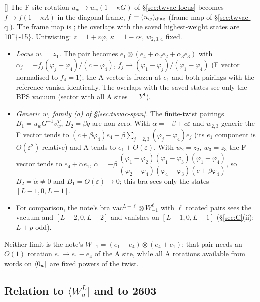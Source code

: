 [] The F-site rotation $u_w\to u_w(1-\kappa G)$ of \S\ref{sec:twvac-locus} becomes $f\to f(1-\kappa\Lambda)$ in the diagonal frame, $f=(u_w)_{\rm diag}$ (frame map of
\S\ref{sec:twvac-q}). The frame map is \ex; the overlaps with the saved highest-weight states are \num{10^{-15}}. Untwisting: $z=1+\varepsilon\varphi$, $\kappa=1-c\varepsilon$, $w_{2,3,4}$ fixed.
\begin{itemize}
\item \emph{Locus $w_1=z_1$.} The pair becomes $e_1\otimes(e_4+\alpha_2e_2+\alpha_3e_3)$ with $\alpha_j=-f_j(\varphi_j-\varphi_4)/(c-\varphi_4)$, $f_j\to(\varphi_1-\varphi_j)/(\varphi_1-\varphi_4)$ (F vector normalised to $f_4=1$); the A vector is frozen at $e_1$
and both pairings with the reference vanish identically. The overlaps with the saved states see only the BPS vacuum (sector with all A sites $=Y^1$).
\item \emph{Generic $w$, family (a) of \S\ref{sec:twvac-span}.} The finite-twist pairings $B_1=u_wG^{-1}v_w^T$, $B_2=\beta q$ are non-zero. With $\alpha=-\beta+c\varepsilon$ and $w_{2,3}$ generic the F vector tends to
$(c+\beta\varphi_4)e_4+\beta\sum_{j=2,3}(\varphi_j-\varphi_4)e_j$ (its $e_1$ component is $O(\varepsilon^2)$ relative) and A tends to $e_1+O(\varepsilon)$. With $w_2=z_2$, $w_3=z_3$ the F vector tends to
$e_4+\tilde\alpha e_1$, $\tilde\alpha=-\beta\,\dfrac{(\varphi_1-\varphi_2)(\varphi_1-\varphi_3)(\varphi_1-\varphi_4)}{(\varphi_2-\varphi_4)(\varphi_4-\varphi_3)(c+\beta\varphi_4)}$, so $B_2=\tilde\alpha\ne0$ and $B_1=O(\varepsilon)\to0$; this bra sees only the
states $[L-1,0,L-1]$.
\item For comparison, the note's bra $\mathrm{vac}^{L-\ell}\otimes W_{-1}^\ell$ with $\ell$ rotated pairs sees the vacuum and $[L-2,0,L-2]$ and vanishes on $[L-1,0,L-1]$ (\S\ref{sec:C}(ii): $L+p$ odd).
\end{itemize}
Neither limit is the note's $W_{-1}=(e_1-e_4)\otimes(e_4+e_1)$: that pair needs an $O(1)$ rotation $e_1\to e_1-e_4$ of the A site, while all A rotations available from words on $\langle0_w|$
are fixed powers of the twist.

\subsection{Relation to \texorpdfstring{$\langle W_a^L|$}{W\_a\^{}L} and to 2603}\label{sec:twvac-2603}

